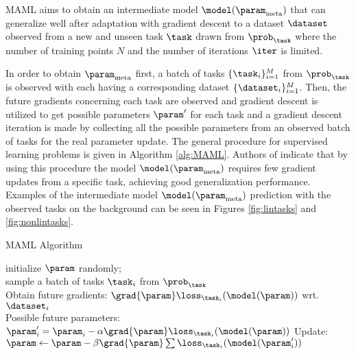 
MAML aims to obtain an intermediate model $\model({\param}_{\text{meta}})$ that can generalize well after adaptation with gradient descent to a dataset $\dataset$ observed from a new and unseen task $\task$ drawn from $\prob_\task$ where the number of training points $N$ and the number of iterations $\iter$ is limited.  

In order to obtain $\param_{\text{meta}}$ first, a batch of tasks $\{\task_i\}_{i=1}^{M}$ from $\prob_{\task}$ is observed with each having a corresponding dataset $\{\dataset_i\}_{i=1}^{M}$. Then, the future gradients concerning each task are observed and gradient descent is utilized to get possible parameters $\param^\prime$ for each task and a gradient descent iteration is made by collecting all the possible parameters from an observed batch of tasks for the real parameter update. The general procedure for supervised learning problems is given in Algorithm \ref{alg:MAML}. Authors of \cite{finn2017} indicate that by using this procedure the model $\model({\param}_{\text{meta}})$ requires few gradient updates from a specific task, achieving good generalization performance. Examples of the intermediate model $\model({\param}_{\text{meta}})$ prediction with the observed tasks on the background can be seen in Figures \ref{fig:lintasks} and \ref{fig:nonlintasks}.

\begin{algorithm}
  \caption{MAML\cite{finn2017} Algorithm}\label{alg:MAML}
  \KwData{$\prob_{\task}$, $\alpha$, $\beta$}
  initialize $\param$ randomly; \\
  {
    sample a batch of tasks $\task_i$ from $\prob_{\task}$\\
    {
      Obtain future gradients: $\grad{\param}\loss_{\task_i}(\model(\param))$ wrt. $\dataset_i$ \\
      Possible future parameters: $\param_i^\prime = \param_i -\alpha\grad{\param}\loss_{\task_i}(\model(\param))$
    }
    Update: $\param \leftarrow \param- \beta\grad{\param}\sum\loss_{\task_i}(\model(\param_i^\prime))$
  }
\end{algorithm}

